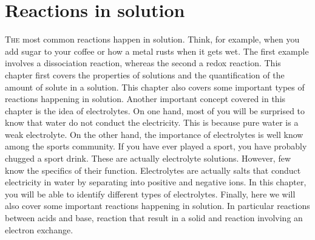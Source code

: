 \documentclass[main.tex]{subfiles} %
\begin{document}
\linenumbers


\chapter[Reactions in solution  ]{Reactions in solution }


 \begin{marginfigure}
\label{fig:electrolytes1}
\end{marginfigure}
\lettrine[lines=4]{\color{black!45}T}{he} most common reactions happen in solution. Think, for example, when you add sugar to your coffee or how a metal rusts when it gets wet. The first example involves a dissociation reaction, whereas the second a redox reaction. This chapter first covers the properties of solutions and the quantification of the amount of solute in a solution. This chapter also covers some important types of reactions happening in solution. Another important concept covered in this chapter is the idea of electrolytes. On one hand, most of you will be surprised to know that water do not conduct the electricity. This is because pure water is a weak electrolyte. On the other hand, the importance of electrolytes is well know among the sports community. If you have ever played a sport, you have probably chugged a sport drink. These are actually electrolyte solutions. However, few know the specifics of their function. Electrolytes are actually salts that conduct electricity in water by separating into positive and negative ions. In this chapter, you will be able to identify different types of electrolytes. Finally, here we will also cover some important reactions happening in solution. In particular reactions between acids and base, reaction that result in a solid and reaction involving an electron exchange.
\end{document}
